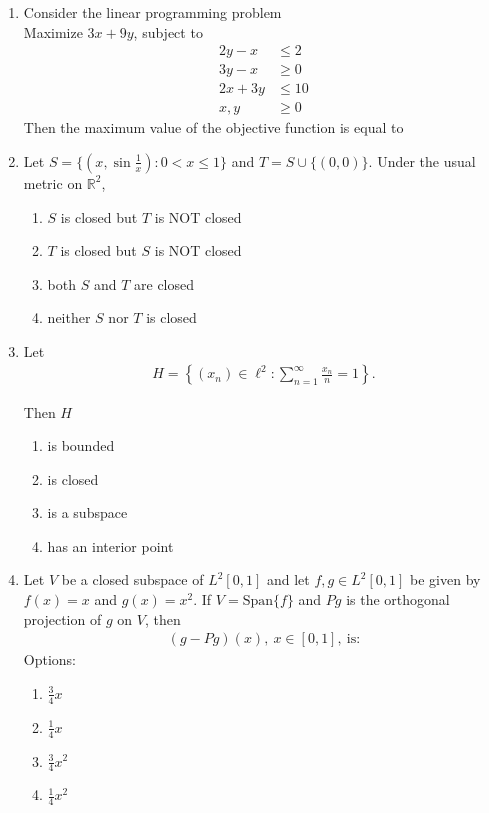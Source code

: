 \documentclass[journal]{IEEEtran}
\numberwithin{equation}{enumi}
\numberwithin{figure}{enumi}
\begin{document}
\begin{enumerate}
\item Consider the linear programming problem\\
Maximize $3x + 9y$, subject to \hfill{}
\begin{align*}
    2y - x &\leq 2 \\
    3y - x &\geq 0 \\
    2x + 3y &\leq 10 \\
    x, y &\geq 0
\end{align*}
Then the maximum value of the objective function is equal to
\underline{\hspace{2cm}}
\vspace{1em}

\item Let $S = \{ (x, \sin \frac{1}{x}) : 0 < x \leq 1 \}$ and $T = S \cup \{ (0,0) \}$.
Under the usual metric on $\mathbb{R}^2$,

\begin{enumerate}
    \item $S$ is closed but $T$ is NOT closed \hfill{}
    \item $T$ is closed but $S$ is NOT closed
    \item both $S$ and $T$ are closed
    \item neither $S$ nor $T$ is closed
\end{enumerate}

\item Let  \hfill{}       \begin{align*}
    H = \left\{ (x_n)\in \ell^2 : \sum_{n=1}^{\infty} \frac{x_n}{n} = 1 \right\}. 
    \end{align*}

Then $H$
 
\begin{enumerate}
    \item is bounded
    \item is closed
    \item is a subspace
    \item has an interior point
\end{enumerate}

\item Let \( V \) be a closed subspace of \( L^2[0,1] \) and let \( f, g \in L^2[0,1] \) be given by \( f(x) = x \) and \( g(x) = x^2 \).  
If \( V = \text{Span}\{f\} \) and \( Pg \) is the orthogonal projection of \( g \) on \( V \), then  
\begin{align*}
(g - Pg)(x), \ x \in [0,1], \ \text{is:} 
 \end{align*}
Options:
\hfill{} 
\begin{multicols}{4}
\begin{enumerate}
  \item $\frac{3}{4}x$
  \item $\frac{1}{4}x$
  \item $\frac{3}{4}x^2$
  \item $\frac{1}{4}x^2$
\end{enumerate}
\end{multicols}


\end{enumerate}
\end{document}
